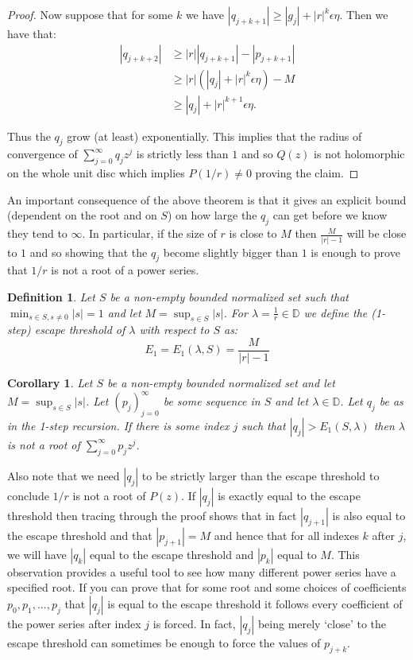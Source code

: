 \documentclass[11pt]{amsart}
\newtheorem{corollary}[theorem]{Corollary}
\newtheorem{definition}[theorem]{Definition}
\numberwithin{theorem}{section} %
\numberwithin{corollary}{section}
\numberwithin{lemma}{section}
\numberwithin{proposition}{section}
\numberwithin{definition}{section}
\begin{document}
\begin{proof}
Now suppose that for some $k$ we have $|q_{j+k+1}| \geqslant |g_j| + |r|^k\epsilon\eta$. Then we have that:
\begin{align*}
|q_{j+k+2}| &\geqslant |r||q_{j+k+1}| - |p_{j+k+1}| \\
&\geqslant |r|(|q_j| +|r|^{k}\epsilon\eta) - M \\
&\geqslant |q_j| + |r|^{k+1}\epsilon\eta.
\end{align*}


Thus the $q_j$ grow (at least) exponentially. This implies that the radius of convergence of $\sum_{j=0}^\infty q_jz^j$ is strictly less than $1$ and so $Q(z)$ is not holomorphic on the whole unit disc which implies $P(1/r) \neq 0$ proving the claim.

\end{proof}


An important consequence of the above theorem is that it gives an explicit bound (dependent on the root and on $S$) on how large the $q_j$ can get before we know they tend to $\infty$. In particular, if the size of $r$ is close to $M$ then $\frac{M}{|r|-1}$ will be close to $1$ and so showing that the $q_j$ become slightly bigger than $1$ is enough to prove that $1/r$ is not a root of a power series.

\begin{definition}
Let $S$ be a non-empty bounded normalized set such that $\min_{s \in S, s \neq 0} |s| = 1$ and let $M = \sup_{s \in S}|s|$. For $\lambda = \frac{1}{r} \in \mathbb{D}$ we define the (1-step) escape threshold of $\lambda$ with respect to $S$ as:
\begin{equation*}
E_1 = E_1(\lambda, S) = \frac{M}{|r| - 1}
\end{equation*}
\end{definition}

\begin{corollary}
Let $S$ be a non-empty bounded normalized set and let $M = \sup_{s \in S} |s|$. Let $(p_j)_{j=0}^\infty$ be some sequence in $S$ and let $\lambda \in \mathbb{D}$. Let $q_j$ be as in the 1-step recursion. If there is some index $j$ such that $|q_j| > E_1(S, \lambda)$ then $\lambda$ is not a root of $\sum_{j=0}^\infty p_jz^j$.
\end{corollary}

Also note that we need $|q_j|$ to be strictly larger than the escape threshold to conclude $1/r$ is not a root of $P(z)$. If $|q_j|$ is exactly equal to the escape threshold then tracing through the proof shows that in fact $|q_{j+1}|$ is also equal to the escape threshold and that $|p_{j+1}| = M$ and hence that for all indexes $k$ after $j$, we will have $|q_{k}|$ equal to the escape threshold and $|p_k|$ equal to $M$. This observation provides a useful tool to see how many different power series have a specified root. If you can prove that for some root and some choices of coefficients $p_0, p_1, ..., p_j$ that $|q_j|$ is equal to the escape threshold it follows every coefficient of the power series after index $j$ is forced. In fact, $|q_j|$ being merely `close' to the escape threshold can sometimes be enough to force the values of $p_{j+k}$.
\end{document}
